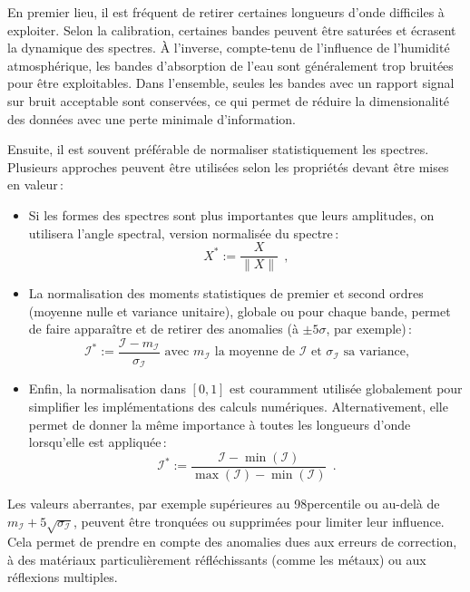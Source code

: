 En premier lieu, il est fréquent de retirer certaines longueurs d'onde difficiles à exploiter. Selon la calibration, certaines bandes peuvent être saturées et écrasent la dynamique des spectres. À l'inverse, compte-tenu de l'influence de l'humidité atmosphérique, les bandes d'absorption de l'eau sont généralement trop bruitées pour être exploitables. Dans l'ensemble, seules les bandes avec un rapport signal sur bruit acceptable sont conservées, ce qui permet de réduire la dimensionalité des données avec une perte minimale d'information.

Ensuite, il est souvent préférable de normaliser statistiquement les spectres. Plusieurs approches peuvent être utilisées selon les propriétés devant être mises en valeur\,:
\begin{itemize}
\item Si les formes des spectres sont plus importantes que leurs amplitudes, on utilisera l'angle spectral, version normalisée du spectre\,:
$$X^* := \frac{X}{\| X \|}~~,$$
\item La normalisation des moments statistiques de premier et second ordres (moyenne nulle et variance unitaire), globale ou pour chaque bande, permet de faire apparaître et de retirer des anomalies (à $\pm5\sigma$, par exemple)\,:
$$\mathcal{I}^* := \frac{\mathcal{I} - m_\mathcal{I}}{\sigma_\mathcal{I}} \text{ avec } m_\mathcal{I} \text{ la moyenne de } \mathcal{I} \text{ et } \sigma_\mathcal{I} \text{ sa variance,}$$
\item Enfin, la normalisation dans $[0,1]$ est couramment utilisée globalement pour simplifier les implémentations des calculs numériques. Alternativement, elle permet de donner la même importance à toutes les longueurs d'onde lorsqu'elle est appliquée\,:
$$\mathcal{I}^* := \frac{\mathcal{I} - \min(\mathcal{I})}{\max(\mathcal{I}) - \min(\mathcal{I})}~~.$$
\end{itemize}

Les valeurs aberrantes, par exemple supérieures au 98\ieme percentile ou au-delà de $m_\mathcal{I} + 5\sqrt{\sigma_\mathcal{I}}$, peuvent être tronquées ou supprimées pour limiter leur influence. Cela permet de prendre en compte des anomalies dues aux erreurs de correction, à des matériaux particulièrement réfléchissants (comme les métaux) ou aux réflexions multiples.

